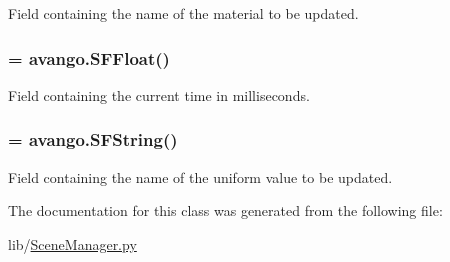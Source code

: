 \-Field containing the name of the material to be updated. 

\hypertarget{classlib_1_1SceneManager_1_1TimedMaterialUniformUpdate_afb8c37beb5d86517c21c2d700e47c95b}{
\subsubsection[{\-Time\-In}]{ = avango.\-S\-F\-Float()}}\label{classlib_1_1SceneManager_1_1TimedMaterialUniformUpdate_afb8c37beb5d86517c21c2d700e47c95b}


\-Field containing the current time in milliseconds. 

\hypertarget{classlib_1_1SceneManager_1_1TimedMaterialUniformUpdate_a3717471a964704994e751a613a7de1e3}{
\subsubsection[{\-Uniform\-Name}]{ = avango.\-S\-F\-String()}}\label{classlib_1_1SceneManager_1_1TimedMaterialUniformUpdate_a3717471a964704994e751a613a7de1e3}


\-Field containing the name of the uniform value to be updated. 



\-The documentation for this class was generated from the following file\-:\begin{DoxyCompactItemize}
\item 
lib/\hyperlink{SceneManager_8py}{\-Scene\-Manager.\-py}\end{DoxyCompactItemize}
